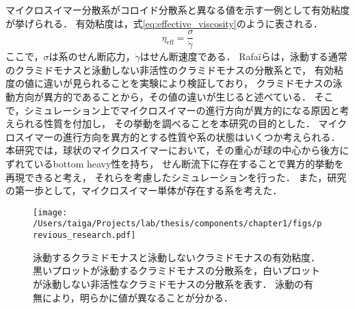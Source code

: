 \documentclass[11pt, a4j, dvipdfmx]{jarticle}
\begin{document}
\par
マイクロスイマー分散系がコロイド分散系と異なる値を示す一例として有効粘度が挙げられる．
有効粘度は，式\eqref{eq:effective_viscosity}のように表される．
    \begin{equation}
        \eta_\mathrm{eff} = \frac{\sigma}{\dot{\gamma}}
        \label{eq:effective_viscosity}
    \end{equation}
ここで，$\sigma$は系のせん断応力，$\dot{\gamma}$はせん断速度である．
Rafa\"iらは，泳動する通常のクラミドモナスと泳動しない非活性のクラミドモナスの分散系とで，
有効粘度の値に違いが見られることを実験により検証しており，
クラミドモナスの泳動方向が異方的であることから，その値の違いが生じると述べている\cite{effective_viscosity}．
そこで，シミュレーション上でマイクロスイマーの進行方向が異方的になる原因と考えられる性質を付加し，
その挙動を調べることを本研究の目的とした．
マイクロスイマーの進行方向を異方的とする性質や系の状態はいくつか考えられる．
本研究では，球状のマイクロスイマーにおいて，その重心が球の中心から後方にずれているbottom heavy性を持ち，
せん断流下に存在することで異方的挙動を再現できると考え，
それらを考慮したシミュレーションを行った．
また，研究の第一歩として，マイクロスイマー単体が存在する系を考えた．
    \begin{figure}[H]
        \centering
        \texttt{[image: /Users/taiga/Projects/lab/thesis/components/chapter1/figs/previous\_research.pdf]}
        \caption{泳動するクラミドモナスと泳動しないクラミドモナスの有効粘度\cite{effective_viscosity}．
        黒いプロットが泳動するクラミドモナスの分散系を，白いプロットが泳動しない非活性なクラミドモナスの分散系を表す．
        泳動の有無により，明らかに値が異なることが分かる．}
    \end{figure}
\end{document}
